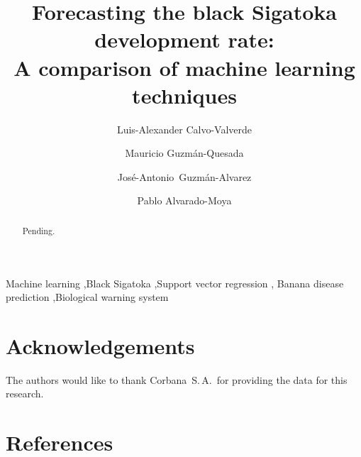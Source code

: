 \documentclass[review,authoryear,english]{elsarticle}
\begin{document}
  \graphicspath{{./}{./fig/}}

\begin{frontmatter}

\title{Forecasting the black Sigatoka development rate:\\ 
A comparison of machine learning techniques}

\author[afiLuisAlex]{Luis-Alexander Calvo-Valverde}

\author[afiCorbana]{Mauricio Guzmán-Quesada}
\author[afiCorbana]{José-Antonio~Guzmán-Alvarez}
\author[afiPablo]{Pablo Alvarado-Moya}

\address[afiLuisAlex]{DOCINADE, Instituto Tecnológico de Costa Rica, 
Computer Research Center, Multidisciplinar program eScience, Cartago, Costa Rica}

\address[afiCorbana]{Dirección de Investigaciones, Corporación Bananera Nacional~S.\,A., Guápiles, Costa Rica}

\address[afiPablo]{DOCINADE, Instituto Tecnológico de Costa Rica, Cartago, Costa Rica}

\begin{abstract}
Pending.
\end{abstract}

\begin{keyword}
Machine learning \sep Black Sigatoka \sep Support vector regression \sep
Banana disease prediction \sep Biological warning system 
\end{keyword}

\end{frontmatter}

\linenumbers








\section*{Acknowledgements}

The authors would like to thank Corbana~S.\,A.\ for providing the data for this research.

\section*{References}


\end{document}
